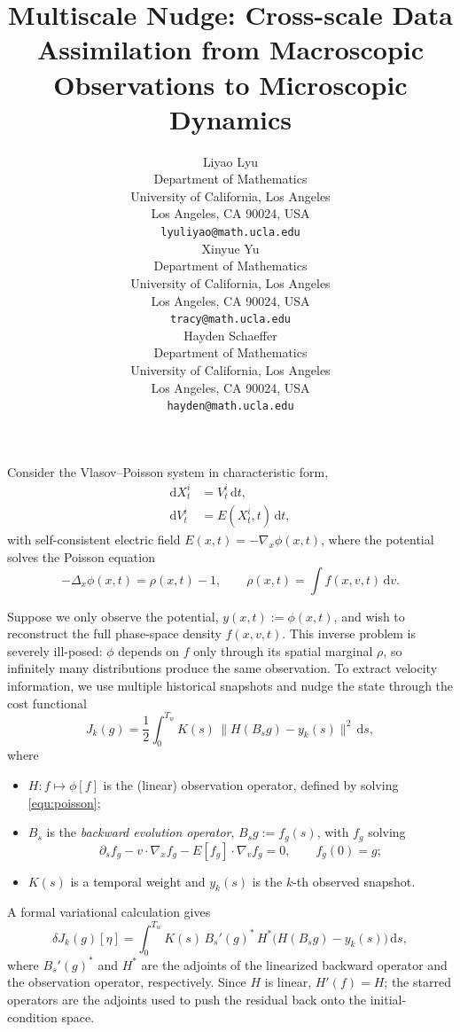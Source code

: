 \documentclass{article}
\title{
Multiscale Nudge: Cross-scale Data Assimilation from Macroscopic Observations to Microscopic Dynamics
}
\author{
  Liyao Lyu\\
  Department of Mathematics \\
  University of California, Los Angeles \\
  Los Angeles, CA 90024, USA\\
  \texttt{lyuliyao@math.ucla.edu} \\
  \AND
   Xinyue Yu \\
  Department of Mathematics \\
  University of California, Los Angeles \\
  Los Angeles, CA 90024, USA\\
  \texttt{tracy@math.ucla.edu} \\
  \AND
   Hayden Schaeffer  \\
  Department of Mathematics \\
  University of California, Los Angeles \\
  Los Angeles, CA 90024, USA\\
  \texttt{hayden@math.ucla.edu} \\
}
\theoremstyle{definition}
\begin{document}
Consider the Vlasov--Poisson system in characteristic form,
\begin{align}
    \mathrm{d} X_t^i &= V_t^i\,\mathrm{d} t,\\
    \mathrm{d} V_t^i &= E(X_t^i,t)\,\mathrm{d} t,
\end{align}
with self-consistent electric field $E(x,t) = -\nabla_x\phi(x,t)$, where the potential solves the Poisson equation
\begin{equation}\label{equ:poisson}
    -\Delta_x\phi(x,t) = \rho(x,t) - 1, 
    \qquad 
    \rho(x,t) = \int f(x,v,t)\,\mathrm{d} v.
\end{equation}


Suppose we only observe the potential, $y(x,t) := \phi(x,t)$, and wish to reconstruct the full phase-space density $f(x,v,t)$. This inverse problem is severely ill-posed: $\phi$ depends on $f$ only through its spatial marginal $\rho$, so infinitely many distributions produce the same observation. To extract velocity information, we use multiple historical snapshots and nudge the state through the cost functional
\begin{equation}
    J_k(g) = \frac{1}{2}\int_0^{T_w} K(s)\,\bigl\|H(B_s g) - y_k(s)\bigr\|^2\,\mathrm{d} s,
\end{equation}
where
\begin{itemize}
    \item $H : f \mapsto \phi[f]$ is the (linear) observation operator, defined by solving \eqref{equ:poisson};
    \item $B_s$ is the \emph{backward evolution operator}, $B_s g := f_g(s)$, with $f_g$ solving
    \begin{equation}\label{equ:bk_operator}
        \partial_s f_g - v\cdot\nabla_x f_g - E[f_g]\cdot\nabla_v f_g = 0, 
        \qquad 
        f_g(0) = g;
    \end{equation}
    \item $K(s)$ is a temporal weight and $y_k(s)$ is the $k$-th observed snapshot.
\end{itemize}


A formal variational calculation gives
\begin{equation}
    \delta J_k(g)[\eta] 
    = \int_0^{T_w} K(s)\, B_s'(g)^{*}\, H^{*}\bigl(H(B_s g) - y_k(s)\bigr)\,\mathrm{d} s,
\end{equation}
where $B_s'(g)^{*}$ and $H^{*}$ are the adjoints of the linearized backward operator and the observation operator, respectively. Since $H$ is linear, $H'(f) = H$; the starred operators are the adjoints used to push the residual back onto the initial-condition space.
\end{document}
